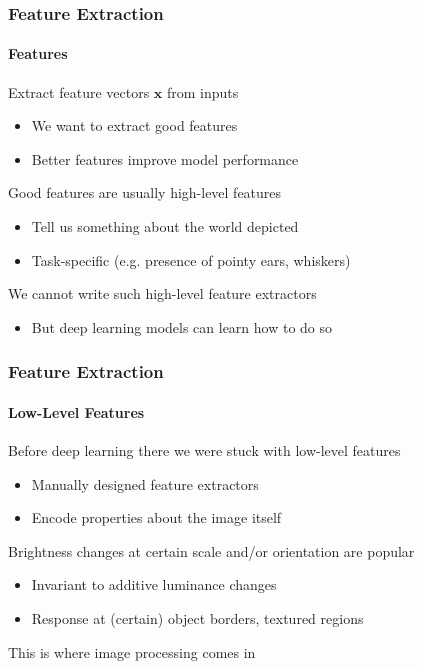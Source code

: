\documentclass[xetex,professionalfont]{beamer}
\renewcommand\emph[1]{\textcolor{tuwcvl_cvl_blue}{#1}}
\newcommand{\eg}{\mbox{e.g.}\xspace} %
\renewcommand{\vec}[1]{\ensuremath{\mathbf{#1}}}
\newcommand{\vx}{\vec{x}}
\begin{document}
\begin{frame}
\frametitle{Feature Extraction}
\framesubtitle{Features}

Extract \emph{feature vectors} $\vx$ from inputs
\begin{itemize}
    \item We want to extract good features
    \item Better features improve model performance
\end{itemize}

\bigskip

Good features are usually \emph{high-level features}
\begin{itemize}
    \item Tell us something about the world depicted %
    \item Task-specific (\eg presence of pointy ears, whiskers)
\end{itemize}

\bigskip

We cannot write such high-level feature extractors
\begin{itemize}
    \item But deep learning models can learn how to do so
\end{itemize}

\end{frame}


\begin{frame}
  \frametitle{Feature Extraction}
  \framesubtitle{Low-Level Features}

Before deep learning there we were stuck with \emph{low-level features}
\begin{itemize}
    \item Manually designed feature extractors
    \item Encode properties about the image itself
\end{itemize}

\bigskip

Brightness changes at certain scale and/or orientation are popular
\begin{itemize}
    \item \emph{Invariant} to additive luminance changes %
    \item Response at (certain) object borders, textured regions %
\end{itemize}

\bigskip

This is where \emph{image processing} comes in %

\end{frame}
\end{document}
